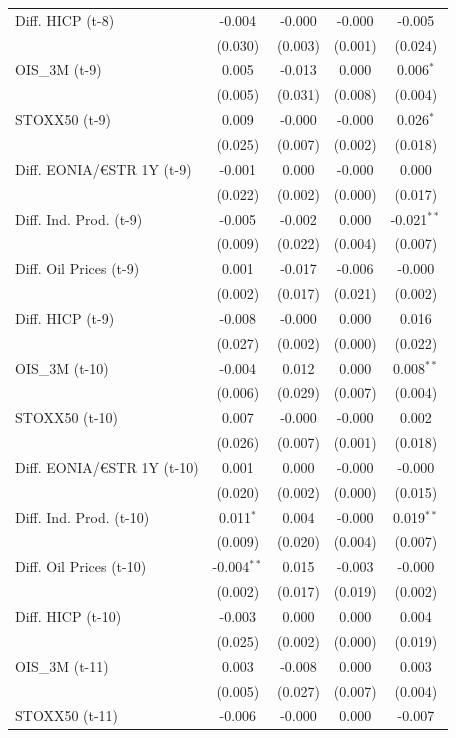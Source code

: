 \begin{longtable}[t]{lcccc}
Diff. HICP (t-8) & -0.004 & -0.000 & -0.000 & -0.005\\
 & (0.030) & (0.003) & (0.001) & (0.024)\\
OIS\_3M (t-9) & 0.005 & -0.013 & 0.000 & 0.006$^{*}$\\
 & (0.005) & (0.031) & (0.008) & (0.004)\\
STOXX50 (t-9) & 0.009 & -0.000 & -0.000 & 0.026$^{*}$\\
 & (0.025) & (0.007) & (0.002) & (0.018)\\
Diff. EONIA/€STR 1Y (t-9) & -0.001 & 0.000 & -0.000 & 0.000\\
 & (0.022) & (0.002) & (0.000) & (0.017)\\
Diff. Ind. Prod. (t-9) & -0.005 & -0.002 & 0.000 & -0.021$^{**}$\\
 & (0.009) & (0.022) & (0.004) & (0.007)\\
Diff. Oil Prices (t-9) & 0.001 & -0.017 & -0.006 & -0.000\\
 & (0.002) & (0.017) & (0.021) & (0.002)\\
Diff. HICP (t-9) & -0.008 & -0.000 & 0.000 & 0.016\\
 & (0.027) & (0.002) & (0.000) & (0.022)\\
OIS\_3M (t-10) & -0.004 & 0.012 & 0.000 & 0.008$^{**}$\\
 & (0.006) & (0.029) & (0.007) & (0.004)\\
STOXX50 (t-10) & 0.007 & -0.000 & -0.000 & 0.002\\
 & (0.026) & (0.007) & (0.001) & (0.018)\\
Diff. EONIA/€STR 1Y (t-10) & 0.001 & 0.000 & -0.000 & -0.000\\
 & (0.020) & (0.002) & (0.000) & (0.015)\\
Diff. Ind. Prod. (t-10) & 0.011$^{*}$ & 0.004 & -0.000 & 0.019$^{**}$\\
 & (0.009) & (0.020) & (0.004) & (0.007)\\
Diff. Oil Prices (t-10) & -0.004$^{**}$ & 0.015 & -0.003 & -0.000\\
 & (0.002) & (0.017) & (0.019) & (0.002)\\
Diff. HICP (t-10) & -0.003 & 0.000 & 0.000 & 0.004\\
 & (0.025) & (0.002) & (0.000) & (0.019)\\
OIS\_3M (t-11) & 0.003 & -0.008 & 0.000 & 0.003\\
 & (0.005) & (0.027) & (0.007) & (0.004)\\
STOXX50 (t-11) & -0.006 & -0.000 & 0.000 & -0.007\\

\end{longtable}
